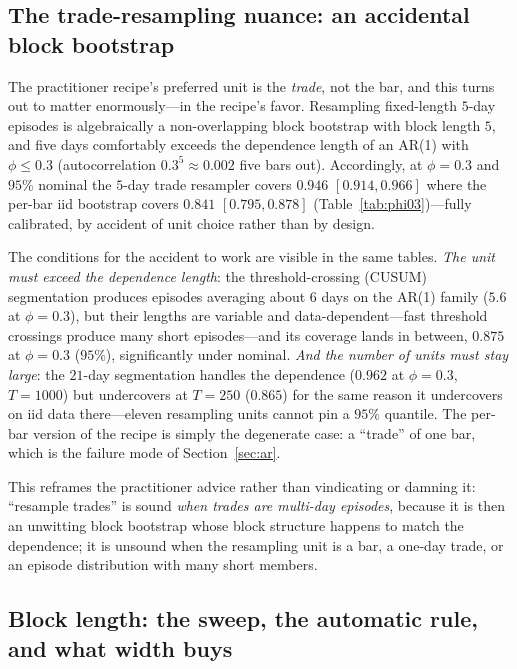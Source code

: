 \documentclass[11pt]{article}
\begin{document}
\subsection{The trade-resampling nuance: an accidental block bootstrap}
\label{sec:trade}

The practitioner recipe's preferred unit is the \emph{trade}, not the bar, and
this turns out to matter enormously---in the recipe's favor. Resampling
fixed-length $5$-day episodes is algebraically a non-overlapping block
bootstrap with block length $5$, and five days comfortably exceeds the
dependence length of an AR(1) with $\phi\le0.3$ (autocorrelation
$0.3^5\approx0.002$ five bars out). Accordingly, at $\phi=0.3$ and $95\%$
nominal the $5$-day trade resampler covers $0.946$ $[0.914,0.966]$ where the
per-bar iid bootstrap covers $0.841$ $[0.795,0.878]$
(Table~\ref{tab:phi03})---fully calibrated, by accident of unit choice rather
than by design.

The conditions for the accident to work are visible in the same tables.
\emph{The unit must exceed the dependence length}: the threshold-crossing
(CUSUM) segmentation produces episodes averaging about $6$ days on the AR(1)
family ($5.6$ at $\phi=0.3$), but their lengths are variable and
data-dependent---fast threshold crossings produce many short episodes---and
its coverage lands in between, $0.875$ at $\phi=0.3$ ($95\%$), significantly
under nominal. \emph{And the number of units must stay large}: the $21$-day
segmentation handles the dependence ($0.962$ at $\phi=0.3$, $T=1000$) but
undercovers at $T=250$ ($0.865$) for the same reason it undercovers on iid
data there---eleven resampling units cannot pin a $95\%$ quantile. The per-bar
version of the recipe is simply the degenerate case: a ``trade'' of one bar,
which is the failure mode of Section~\ref{sec:ar}.

This reframes the practitioner advice rather than vindicating or damning it:
``resample trades'' is sound \emph{when trades are multi-day episodes}, because
it is then an unwitting block bootstrap whose block structure happens to match
the dependence; it is unsound when the resampling unit is a bar, a one-day
trade, or an episode distribution with many short members.

\subsection{Block length: the sweep, the automatic rule, and what width buys}
\label{sec:block}
\end{document}
